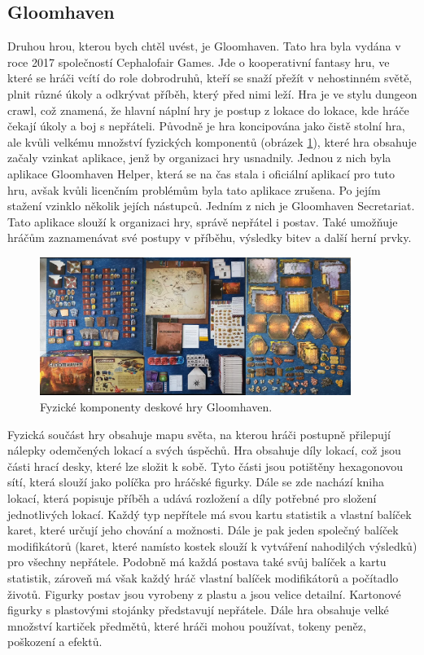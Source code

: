 \subsection{Gloomhaven}
Druhou hrou, kterou bych chtěl uvést, je Gloomhaven. Tato hra byla vydána v roce 2017 společností Cephalofair Games. Jde o kooperativní fantasy hru, ve které se hráči vcítí do role dobrodruhů, kteří se snaží přežít v nehostinném světě, plnit různé úkoly a odkrývat příběh, který před nimi leží. Hra je ve stylu dungeon crawl, což znamená, že hlavní náplní hry je postup z lokace do lokace, kde hráče čekají úkoly a boj s nepřáteli. Původně je hra koncipována jako čistě stolní hra, ale kvůli velkému množství fyzických komponentů (obrázek \ref{fig:gloomhaven_contents}), které hra obsahuje začaly vzinkat aplikace, jenž by organizaci hry usnadnily. Jednou z nich byla aplikace Gloomhaven Helper\cite{gloomhaven_helper}, která se na čas stala i oficiální aplikací pro tuto hru, avšak kvůli licenčním problémům byla tato aplikace zrušena. Po jejím stažení vzinklo několik jejích nástupců. Jedním z nich je Gloomhaven Secretariat\cite{gloomhaven_secretariat}. Tato aplikace slouží k organizaci hry, správě nepřátel i postav. Také umožňuje hráčům zaznamenávat své postupy v příběhu, výsledky bitev a další herní prvky.

\begin{figure}[H]
    \centering
    \includegraphics[width=0.9\textwidth]{resources/figures/gloomhaven.png}
    \caption{Fyzické komponenty deskové hry Gloomhaven.\cite{gloomhaven}}
    \label{fig:gloomhaven_contents}
\end{figure}

Fyzická součást hry obsahuje mapu světa, na kterou hráči postupně přilepují nálepky odemčených lokací a svých úspěchů. Hra obsahuje díly lokací, což jsou části hrací desky, které lze složit k sobě. Tyto části jsou potištěny hexagonovou sítí, která slouží jako políčka pro hráčské figurky. Dále se zde nachází kniha lokací, která popisuje příběh a udává rozložení a díly potřebné pro složení jednotlivých lokací. Každý typ nepřítele má svou kartu statistik a vlastní balíček karet, které určují jeho chování a možnosti. Dále je pak jeden společný balíček modifikátorů (karet, které namísto kostek slouží k vytváření nahodilých výsledků) pro všechny nepřátele. Podobně má každá postava také svůj balíček a kartu statistik, zároveň má však každý hráč vlastní balíček modifikátorů a počítadlo životů. Figurky postav jsou vyrobeny z plastu a jsou velice detailní. Kartonové figurky s plastovými stojánky představují nepřátele. Dále hra obsahuje velké množství kartiček předmětů, které hráči mohou používat, tokeny peněz, poškození a efektů.